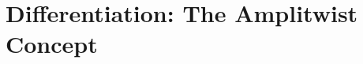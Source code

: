 \setcounter{thesection}{3}
\section{Differentiation: The Amplitwist Concept}

\begin{card}
    \subsection{}

    \begin{compactdesc}
    \item[]
    \end{compactdesc}
\end{card}




\begin{card}
    \subsection{}

    \begin{compactdesc}
    \item[]
    \end{compactdesc}
\end{card}




